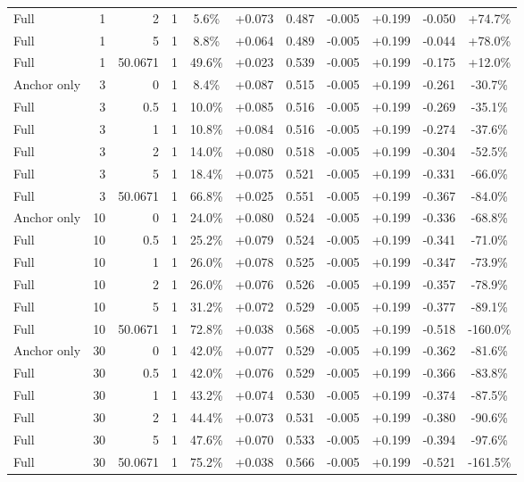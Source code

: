 \begin{table}[htbp]
\begin{tabular}{lrrrccccccc}
Full & 1 & 2 & 1 & 5.6\% & +0.073 & 0.487 & -0.005 & +0.199 & -0.050 & +74.7\% \\
Full & 1 & 5 & 1 & 8.8\% & +0.064 & 0.489 & -0.005 & +0.199 & -0.044 & +78.0\% \\
Full & 1 & 50.0671 & 1 & 49.6\% & +0.023 & 0.539 & -0.005 & +0.199 & -0.175 & +12.0\% \\
Anchor only & 3 & 0 & 1 & 8.4\% & +0.087 & 0.515 & -0.005 & +0.199 & -0.261 & -30.7\% \\
Full & 3 & 0.5 & 1 & 10.0\% & +0.085 & 0.516 & -0.005 & +0.199 & -0.269 & -35.1\% \\
Full & 3 & 1 & 1 & 10.8\% & +0.084 & 0.516 & -0.005 & +0.199 & -0.274 & -37.6\% \\
Full & 3 & 2 & 1 & 14.0\% & +0.080 & 0.518 & -0.005 & +0.199 & -0.304 & -52.5\% \\
Full & 3 & 5 & 1 & 18.4\% & +0.075 & 0.521 & -0.005 & +0.199 & -0.331 & -66.0\% \\
Full & 3 & 50.0671 & 1 & 66.8\% & +0.025 & 0.551 & -0.005 & +0.199 & -0.367 & -84.0\% \\
Anchor only & 10 & 0 & 1 & 24.0\% & +0.080 & 0.524 & -0.005 & +0.199 & -0.336 & -68.8\% \\
Full & 10 & 0.5 & 1 & 25.2\% & +0.079 & 0.524 & -0.005 & +0.199 & -0.341 & -71.0\% \\
Full & 10 & 1 & 1 & 26.0\% & +0.078 & 0.525 & -0.005 & +0.199 & -0.347 & -73.9\% \\
Full & 10 & 2 & 1 & 26.0\% & +0.076 & 0.526 & -0.005 & +0.199 & -0.357 & -78.9\% \\
Full & 10 & 5 & 1 & 31.2\% & +0.072 & 0.529 & -0.005 & +0.199 & -0.377 & -89.1\% \\
Full & 10 & 50.0671 & 1 & 72.8\% & +0.038 & 0.568 & -0.005 & +0.199 & -0.518 & -160.0\% \\
Anchor only & 30 & 0 & 1 & 42.0\% & +0.077 & 0.529 & -0.005 & +0.199 & -0.362 & -81.6\% \\
Full & 30 & 0.5 & 1 & 42.0\% & +0.076 & 0.529 & -0.005 & +0.199 & -0.366 & -83.8\% \\
Full & 30 & 1 & 1 & 43.2\% & +0.074 & 0.530 & -0.005 & +0.199 & -0.374 & -87.5\% \\
Full & 30 & 2 & 1 & 44.4\% & +0.073 & 0.531 & -0.005 & +0.199 & -0.380 & -90.6\% \\
Full & 30 & 5 & 1 & 47.6\% & +0.070 & 0.533 & -0.005 & +0.199 & -0.394 & -97.6\% \\
Full & 30 & 50.0671 & 1 & 75.2\% & +0.038 & 0.566 & -0.005 & +0.199 & -0.521 & -161.5\% \\

\end{tabular}
\end{table}
